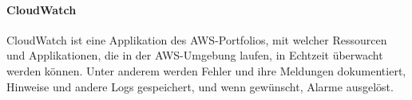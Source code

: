\paragraph{CloudWatch} 
CloudWatch ist eine Applikation des AWS-Portfolios, mit welcher Ressourcen und Applikationen, die in der AWS-Umgebung laufen, in Echtzeit überwacht werden können. Unter anderem werden Fehler und ihre Meldungen dokumentiert, Hinweise und andere Logs gespeichert, und wenn gewünscht, Alarme ausgelöst. 